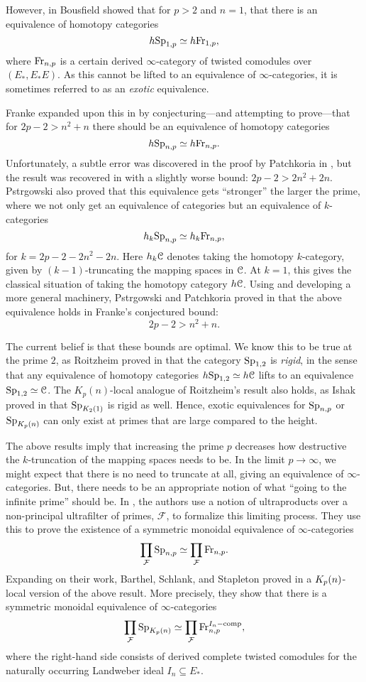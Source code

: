 However, in \cite{bousfield_1985} Bousfield showed that for $p>2$ and $n=1$, that there is an equivalence of homotopy categories
\[h \mathrm{Sp}_{1,p}\simeq h \mathrm{Fr}_{1,p},\]
where $\mathrm{Fr}_{n,p}$ is a certain derived $\infty$-category of twisted comodules over $(E_*, E_*E)$. As this cannot be lifted to an equivalence of $\infty$-categories, it is sometimes referred to as an \emph{exotic} equivalence. 

Franke expanded upon this in \cite{franke_96} by conjecturing---and attempting to prove---that for $2p-2 > n^2+n$ there should be an equivalence of homotopy categories
\[h \mathrm{Sp}_{n,p}\simeq h \mathrm{Fr}_{n,p}.\]
Unfortunately, a subtle error was discovered in the proof by Patchkoria in \cite{patchkoria_2013}, but the result was recovered in \cite{pstragowski_2021} with a slightly worse bound: $2p-2>2n^2+2n$. Pstr\a{}gowski also proved that this equivalence gets ``stronger'' the larger the prime, where we not only get an equivalence of categories but an equivalence of $k$-categories 
\[h_k \mathrm{Sp}_{n,p}\simeq h_k \mathrm{Fr}_{n,p},\]
for $k=2p-2-2n^2-2n$. Here $h_k \EuScript{C}$ denotes taking the homotopy $k$-category, given by $(k-1)$-truncating the mapping spaces in $\EuScript{C}$. At $k=1$, this gives the classical situation of taking the homotopy category $h\EuScript{C}$. Using and developing a more general machinery, Pstr\a{}gowski and Patchkoria proved in \cite{patchkoria-pstragowski_2021} that the above equivalence holds in Franke's conjectured bound:
\[2p-2>n^2+n.\] 

The current belief is that these bounds are optimal. We know this to be true at the prime $2$, as Roitzheim proved in \cite{roitzheim_07} that the category $\mathrm{Sp}_{1,2}$ is \emph{rigid}, in the sense that any equivalence of homotopy categories $h\mathrm{Sp}_{1,2} \simeq h\EuScript{C}$ lifts to an equivalence $\mathrm{Sp}_{1,2}\simeq \EuScript{C}$. The $K_p(n)$-local analogue of Roitzheim's result also holds, as Ishak proved in \cite{ishak_19} that $\mathrm{Sp}_{K_2(1)}$ is rigid as well. Hence, exotic equivalences for $\mathrm{Sp}_{n,p}$ or $\mathrm{Sp}_{{K_p(n)}}$ can only exist at primes that are large compared to the height. 

The above results imply that increasing the prime $p$ decreases how destructive the $k$-truncation of the mapping spaces needs to be. In the limit $p\rightarrow \infty$, we might expect that there is no need to truncate at all, giving an equivalence of $\infty$-categories. But, there needs to be an appropriate notion of what ``going to the infinite prime'' should be. In \cite{barthel-schlank-stapleton_2020}, the authors use a notion of ultraproducts over a non-principal ultrafilter of primes, $\mathcal{F}$, to formalize this limiting process. They use this to prove the existence of a symmetric monoidal equivalence of $\infty$-categories
\[\prod_{\mathcal{F}}\mathrm{Sp}_{n,p} \simeq \prod_{\mathcal{F}}\mathrm{Fr}_{n,p}.\] 
Expanding on their work, Barthel, Schlank, and Stapleton proved in \cite{barthel-schlank-stapleton_2021} a ${K_p(n)}$-local version of the above result. More precisely, they show that there is a symmetric monoidal equivalence of $\infty$-categories
\[\prod_{\mathcal{F}}\mathrm{Sp}_{{K_p(n)}} \simeq \prod_{\mathcal{F}}\mathrm{Fr}_{n,p}^{I_n-\mathrm{comp}},\]
where the right-hand side consists of derived complete twisted comodules for the naturally occurring Landweber ideal $I_n\subseteq E_*$. 

